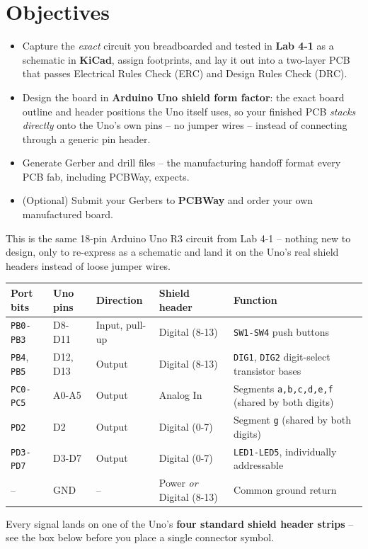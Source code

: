 \documentclass[11pt]{article}
\begin{document}
\labheader

\section*{Objectives}
\begin{itemize}[leftmargin=*,nosep]
  \item Capture the \emph{exact} circuit you breadboarded and tested in
        \textbf{Lab 4-1} as a schematic in \textbf{KiCad}, assign footprints, and lay
        it out into a two-layer PCB that passes Electrical Rules Check (ERC) and
        Design Rules Check (DRC).
  \item Design the board in \textbf{Arduino Uno shield form factor}: the exact
        board outline and header positions the Uno itself uses, so your finished
        PCB \emph{stacks directly} onto the Uno's own pins -- no jumper wires --
        instead of connecting through a generic pin header.
  \item Generate Gerber and drill files -- the manufacturing handoff format every
        PCB fab, including PCBWay, expects.
  \item (Optional) Submit your Gerbers to \textbf{PCBWay} and order your own
        manufactured board.
\end{itemize}

\begin{summary}
This is the same 18-pin Arduino Uno R3 circuit from Lab 4-1 -- nothing new to
design, only to re-express as a schematic and land it on the Uno's real shield
headers instead of loose jumper wires.
\begin{center}
\begin{tabular}{@{}p{1.7cm}p{1.5cm}p{2.0cm}p{2.9cm}p{4.3cm}@{}}
\toprule
\textbf{Port bits} & \textbf{Uno pins} & \textbf{Direction} & \textbf{Shield header} & \textbf{Function} \\
\midrule
\texttt{PB0-PB3} & D8-D11 & Input, pull-up & Digital (8-13) & \texttt{SW1-SW4} push buttons \\
\texttt{PB4}, \texttt{PB5} & D12, D13 & Output & Digital (8-13) & \texttt{DIG1}, \texttt{DIG2} digit-select transistor bases \\
\texttt{PC0-PC5} & A0-A5 & Output & Analog In & Segments \texttt{a,b,c,d,e,f} (shared by both digits) \\
\texttt{PD2} & D2 & Output & Digital (0-7) & Segment \texttt{g} (shared by both digits) \\
\texttt{PD3-PD7} & D3-D7 & Output & Digital (0-7) & \texttt{LED1-LED5}, individually addressable \\
-- & GND & -- & Power \emph{or} Digital (8-13) & Common ground return \\
\bottomrule
\end{tabular}
\end{center}
Every signal lands on one of the Uno's \textbf{four standard shield header
strips} -- see the box below before you place a single connector symbol.
\end{summary}
\end{document}
